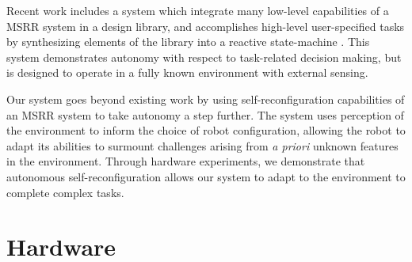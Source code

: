 \documentclass[conference]{IEEEtran}
\begin{document}

Recent work includes a system which integrate many low-level capabilities of a MSRR system in a design library, and accomplishes high-level user-specified tasks by synthesizing elements of the library into a reactive state-machine \cite{Jing2016}. This system demonstrates autonomy with respect to task-related decision making, but is designed to operate in a fully known environment with external sensing.

Our system goes beyond existing work by using self-reconfiguration capabilities of an MSRR system to take autonomy a step further.  The system uses perception of the environment to inform the choice of robot configuration, allowing the robot to adapt its abilities to surmount challenges arising from \textit{a priori} unknown features in the environment. Through hardware experiments, we demonstrate that autonomous self-reconfiguration allows our system to adapt to the environment to complete complex tasks.

\section{Hardware} %
\label{sec:hardware}
%
\end{document}
